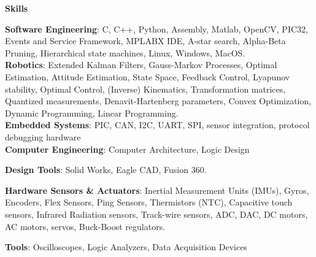 \documentclass[paper=a4,fontsize=11pt]{article} %
\def \sectionSpace      {0.5cm}     %
\def \subSectionSpace   {0.1cm}     %
\def \leftColSpace      {0.12}      %
\def \bigMiddleColSpace {0.875}     %
\def \lineWidth         {18cm}      %
\def \lineThickness     {2pt}       %
\begin{document}
\vspace{\sectionSpace}
\noindent
\begin{minipage}[t]{\leftColSpace\linewidth}
\begin{flushleft}
\noindent \textbf{Skills}\\
\end{flushleft}
\end{minipage}
\begin{minipage}[t]{\bigMiddleColSpace\linewidth}
\begin{flushleft}
\noindent \textbf{Software Engineering}: C, C++, Python, Assembly, Matlab, OpenCV, PIC32, Events and Service Framework, MPLABX IDE, A-star search, Alpha-Beta Pruning, Hierarchical state machines, Linux, Windows, MacOS.\\

\vspace{\subSectionSpace}
\noindent \textbf{Robotics}: Extended Kalman Filters, Gauss-Markov Processes, Optimal Estimation, Attitude Estimation, State Space, Feedback Control, Lyapunov stability, Optimal Control, (Inverse) Kinematics, Transformation matrices, Quantized measurements, Denavit-Hartenberg parameters, Convex Optimization, Dynamic Programming, Linear Programming.\\

\vspace{\subSectionSpace}
\noindent \textbf{Embedded Systems}: PIC, CAN, I2C, UART, SPI, sensor integration, protocol debugging hardware\\

\vspace{\subSectionSpace}
\noindent \textbf{Computer Engineering}: Computer Architecture, Logic Design

\vspace{\subSectionSpace}
\noindent \textbf{Design Tools}: Solid Works, Eagle CAD, Fusion 360.

\vspace{\subSectionSpace}
\noindent \textbf{Hardware Sensors \& Actuators}: Inertial Measurement Units (IMUs), Gyros, Encoders, Flex Sensors, Ping Sensors, Thermistors (NTC), Capacitive touch sensors, Infrared Radiation sensors, Track-wire sensors, ADC, DAC, DC motors, AC motors, servos, Buck-Boost regulators.

\vspace{\subSectionSpace}
\noindent \textbf{Tools}: Oscilloscopes, Logic Analyzers, Data Acquisition Devices
\end{flushleft}
\end{minipage}
\end{document}
